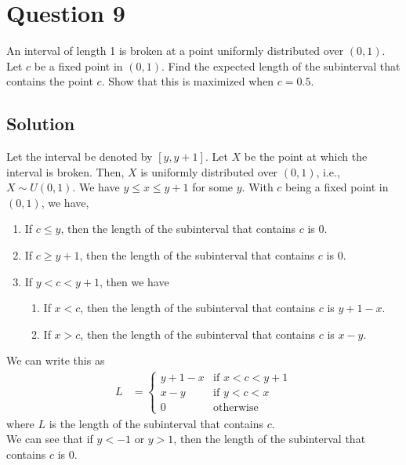 \section*{Question 9}

An interval of length 1 is broken at a point uniformly distributed over \( (0,1) \).
Let \( c \) be a fixed point in \( (0,1) \).
Find the expected length of the subinterval that contains the point \( c \).
Show that this is maximized when \( c=0.5 \).

\subsection*{Solution}

Let the interval be denoted by \( [y, y+1] \).
Let \( X \) be the point at which the interval is broken.
Then, \( X \) is uniformly distributed over \( (0,1) \), i.e., \( X \sim U(0, 1) \).
We have \( y \leq x \leq y+1 \) for some \( y \).
With \( c \) being a fixed point in \( (0,1) \), we have,
\begin{enumerate}
    \item If \( c \leq y \), then the length of the subinterval that contains \( c \) is \( 0 \).
    \item If \( c \geq y+1 \), then the length of the subinterval that contains \( c \) is \( 0 \).
    \item If \( y < c < y+1 \), then we have
          \begin{enumerate}
              \item If \( x < c \), then the length of the subinterval that contains \( c \) is \( y+1-x \).
              \item If \( x > c \), then the length of the subinterval that contains \( c \) is \( x-y \).
          \end{enumerate}
\end{enumerate}
We can write this as
\begin{align*}
    L
     & =
    \begin{cases}
        y+1-x
         &
        \text{if } x < c < y + 1
        \\
        x-y
         &
        \text{if } y < c < x
        \\
        0
         &
        \text{otherwise}
    \end{cases}
\end{align*}
where \( L \) is the length of the subinterval that contains \( c \). \\
We can see that if \( y < -1 \) or \( y > 1 \), then the length of the subinterval that contains \( c \) is \( 0 \).

